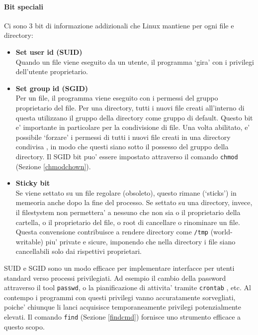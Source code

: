 \paragraph{Bit speciali}
Ci sono 3 bit di informazione addizionali che Linux mantiene per ogni file e directory:
\begin{itemize}
	\item \textbf{Set user id (SUID)}\\
		Quando un file viene eseguito da un utente, il programma `gira' con i privilegi dell'utente proprietario.
	\item \textbf{Set group id (SGID)}\\
		Per un file, il programma viene eseguito con i permessi del gruppo proprietario del file. Per una directory, tutti i nuovi file creati all'interno di questa utilizzano il gruppo della directory come gruppo di default. Questo bit e' importante in particolare per la condivisione di file. Una volta abilitato, e' possibile `forzare' i permessi di tutti i nuovi file creati in una directory condivisa , in modo che questi siano sotto il possesso del gruppo della directory. Il SGID bit puo' essere impostato attraverso il comando \texttt{chmod} (Sezione \ref{chmodchown}).
	\item \textbf{Sticky bit}\\
		Se viene settato su un file regolare (obsoleto), questo rimane (`sticks') in memeoria anche dopo la fine del processo. Se settato su una directory, invece, il filestystem non permettera' a nessuno che non sia o il proprietario della cartella, o il proprietario del file, o root di cancellare o rinominare un file. Questa convensione contribuisce a rendere directory come \texttt{/tmp} (world-writable) piu' private e sicure, imponendo che nella directory i file siano cancellabili solo dai rispettivi proprietari.
\end{itemize}
SUID e SGID sono un modo efficace per implementare interfacce per utenti standard verso processi privilegiati. Ad esempio il cambio della password attraverso il tool \texttt{passwd}, o la pianificazione di attivita' tramite \texttt{crontab} , etc. Al contempo i programmi con questi privilegi vanno accuratamente sorvegliati, poiche' chiunque li lanci acquisisce temporaneamente privilegi potenzialmente elevati. Il comando \texttt{find} (Sezione \ref{findcmd}) fornisce uno strumento efficace a questo scopo.

